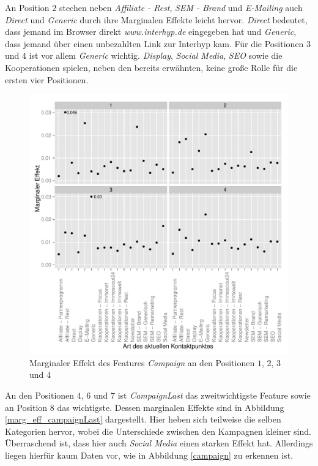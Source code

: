 An Position $2$ stechen neben \textit{Affiliate - Rest}, \textit{SEM - Brand} und \textit{E-Mailing} auch \textit{Direct} und \textit{Generic} durch ihre Marginalen Effekte leicht hervor. \textit{Direct} bedeutet, dass jemand im Browser direkt \textit{www.interhyp.de} eingegeben hat und \textit{Generic}, dass jemand über einen unbezahlten Link zur Interhyp kam.
Für die Positionen $3$ und $4$ ist vor allem \textit{Generic} wichtig. \textit{Display}, \textit{Social Media}, \textit{SEO} sowie die Kooperationen spielen, neben den bereits erwähnten, keine große Rolle für die ersten vier Positionen.
\begin{figure}[H]
	\centering\includegraphics[scale=0.75]{marg_eff_campaign.pdf}\caption{Marginaler Effekt des Features \textit{Campaign} an den Positionen $1$, $2$, $3$ und $4$}\label{marg_eff_campaign}
\end{figure}
An den Positionen $4$, $6$ und $7$ ist \textit{CampaignLast} das zweitwichtigste Feature sowie an Position $8$ das wichtigste. Dessen marginalen Effekte sind in Abbildung \ref{marg_eff_campaignLast} dargestellt. Hier heben sich teilweise die selben Kategorien hervor, wobei die Unterschiede zwischen den Kampagnen kleiner sind. Überraschend ist, dass hier auch \textit{Social Media} einen starken Effekt hat. Allerdings liegen hierfür kaum Daten vor, wie in Abbildung \ref{campaign} zu erkennen ist.\\
